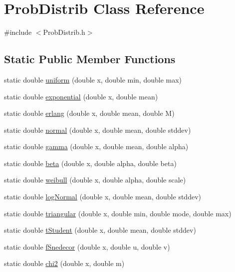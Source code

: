 \hypertarget{class_prob_distrib}{}\section{Prob\+Distrib Class Reference}
\label{class_prob_distrib}


{\ttfamily \#include $<$Prob\+Distrib.\+h$>$}

\subsection*{Static Public Member Functions}
\begin{DoxyCompactItemize}
\item 
static double \hyperlink{class_prob_distrib_a4ff9f4d4faa1c29eb970c2629b332032}{uniform} (double x, double min, double max)
\item 
static double \hyperlink{class_prob_distrib_ad638ee57a1ad9ffe4a81e6f7607736a2}{exponential} (double x, double mean)
\item 
static double \hyperlink{class_prob_distrib_abeca85f25317ff97d9ca14d6a4abbb2d}{erlang} (double x, double mean, double M)
\item 
static double \hyperlink{class_prob_distrib_a5ca4ebda2818070339b707a880e3d1a4}{normal} (double x, double mean, double stddev)
\item 
static double \hyperlink{class_prob_distrib_a2a5a2f10a9ba6475591597643b555ab9}{gamma} (double x, double mean, double alpha)
\item 
static double \hyperlink{class_prob_distrib_af74e5c70a59727220d52a7f445992b28}{beta} (double x, double alpha, double beta)
\item 
static double \hyperlink{class_prob_distrib_a74aadd83aaa5459d3a9dd534f6dce82a}{weibull} (double x, double alpha, double scale)
\item 
static double \hyperlink{class_prob_distrib_ad6e3ae223763aae5c2fe7d347523adbb}{log\+Normal} (double x, double mean, double stddev)
\item 
static double \hyperlink{class_prob_distrib_a057f5c5a97ab296f60b1a92ec1886162}{triangular} (double x, double min, double mode, double max)
\item 
static double \hyperlink{class_prob_distrib_a5f202b23b735b4b76c82505145ba0f76}{t\+Student} (double x, double mean, double stddev)
\item 
static double \hyperlink{class_prob_distrib_ab9b9b1e3dd7ace961991f67e73bee3e5}{f\+Snedecor} (double x, double u, double v)
\item 
static double \hyperlink{class_prob_distrib_a410740a950910c827d61c673d0077006}{chi2} (double x, double m)
\end{DoxyCompactItemize}


